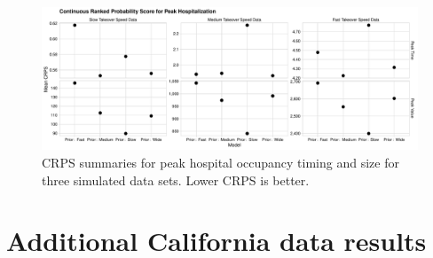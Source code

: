 \begin{figure}
    \centering
    \includegraphics[width=1.0\columnwidth]{sensitivity_simulated_peak_crps_dotplot_plot}
    \caption[CRPS summaries for peak hospital occupancy in simulated data sets.]{CRPS summaries for peak hospital occupancy timing and size for three simulated data sets. Lower CRPS is better.}
    \label{ch_5:fig:sensitivity_simulated_peak_crps_dotplot_plot}
\end{figure}

\section{Additional California data results}

